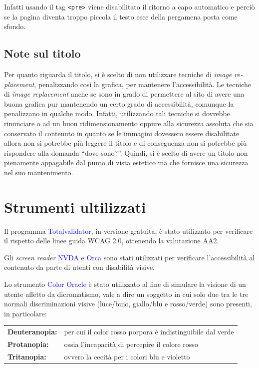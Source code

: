 \documentclass[10pt,a4paper,onecolumn]{article}
\newcommand{\inglese}[1]{\foreignlanguage{english}{\itshape{}#1}}
\newcommand{\progname}[1]{\textcolor{blue}{\textsf{#1}}}
\begin{document}
Infatti usando il tag \texttt{<pre>} viene disabilitato il ritorno a capo automatico e perciò se la pagina diventa troppo piccola il testo esce della pergamena posta come sfondo.

\subsection{Note sul titolo}

Per quanto riguarda il titolo, si è scelto di non utilizzare tecniche di \inglese{image replacement}, penalizzando così la grafica, per mantenere l'accessibilità. Le tecniche di \inglese{image replacement} anche se sono in grado di permettere al sito di avere una buona grafica pur mantenendo un certo grado di accessibilità, comunque la penalizzano in qualche modo. Infatti, utilizzando tali tecniche si dovrebbe rinunciare o ad un buon ridimensionamento oppure alla sicurezza assoluta che sia conservato il contenuto in quanto se le immagini dovessero essere disabilitate allora non si potrebbe più leggere il titolo e di conseguenza non si potrebbe più rispondere alla domanda ``dove sono?''. Quindi, si è scelto di avere un titolo non pienamente appagabile dal punto di vista estetico ma che fornisce una sicurezza nel suo mantenimento.

\section{Strumenti ultilizzati}

Il programma \progname{Totalvalidator}, in versione gratuita, è stato utilizzato per verificare il rispetto delle linee guida WCAG 2.0, ottenendo la valutazione AA2.


Gli \inglese{screen reader}  \progname{	NVDA} e  \progname{Orca} sono stati utilizzati per verificare l'accessibilità al contenuto da parte di utenti con disabilità visive.

Lo strumento \progname{Color Oracle} è stato utilizzato al fine di simulare la visione di un utente affetto da dicromatismo, vale a dire un soggetto in cui solo due tra le tre normali discriminazioni visive (luce/buio, giallo/blu e rosso/verde) sono presenti, in particolare:

\begin{tabular}{>{\sffamily\bfseries}lp{}}
  Deuteranopia: & per cui il color rosso porpora è indistinguibile dal verde\\
  Protanopia: & ossia l'incapacità di percepire il colore rosso\\
  Tritanopia: & ovvero la cecità per i colori blu e violetto\\
\end{tabular}
\end{document}
